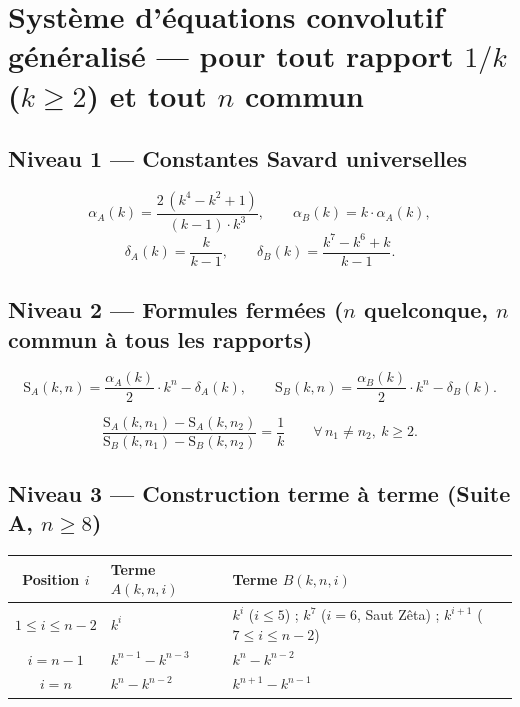 \documentclass[11pt,a4paper]{article}
\newcommand{\SA}{\mathrm{S}_A}
\newcommand{\SB}{\mathrm{S}_B}
\begin{document}
\section{Système d'équations convolutif généralisé --- pour tout rapport $1/k$ ($k \ge 2$) et tout $n$ commun}

\subsection{Niveau 1 --- Constantes Savard universelles}

\begin{boiteformule}
\[
\alpha_A(k) = \frac{2\,(k^{4} - k^{2} + 1)}{(k-1)\cdot k^{3}},
\qquad
\alpha_B(k) = k \cdot \alpha_A(k),
\]
\[
\delta_A(k) = \frac{k}{k-1},
\qquad
\delta_B(k) = \frac{k^{7} - k^{6} + k}{k-1}.
\]
\end{boiteformule}

\subsection{Niveau 2 --- Formules fermées ($n$ quelconque, $n$ commun à tous les rapports)}

\begin{boiteformule}
\[
\SA(k,n) = \frac{\alpha_A(k)}{2}\cdot k^{n} - \delta_A(k),
\qquad
\SB(k,n) = \frac{\alpha_B(k)}{2}\cdot k^{n} - \delta_B(k).
\]
\end{boiteformule}

\begin{boitenote}
\[
\frac{\SA(k,n_1) - \SA(k,n_2)}{\SB(k,n_1) - \SB(k,n_2)} = \frac{1}{k}
\qquad \forall\, n_1 \neq n_2,\ k \ge 2.
\]
\end{boitenote}

\subsection{Niveau 3 --- Construction terme à terme (Suite A, $n \ge 8$)}

\begin{center}
\small
\begin{tabular}{@{}c l l@{}}
\toprule
\rowcolor{spectralgris}
Position $i$ & Terme $A(k,n,i)$ & Terme $B(k,n,i)$ \\
\midrule
$1 \le i \le n-2$ & $k^{i}$ & $k^{i}$ ($i \le 5$) ; $k^{7}$ ($i=6$, Saut Zêta) ; $k^{i+1}$ ($7 \le i \le n-2$) \\
$i = n-1$ & $k^{n-1} - k^{n-3}$ & $k^{n} - k^{n-2}$ \\
$i = n$ & $k^{n} - k^{n-2}$ & $k^{n+1} - k^{n-1}$ \\
\bottomrule
\end{tabular}
\end{center}
\end{document}
